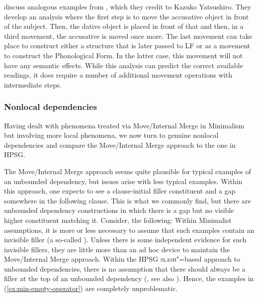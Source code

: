\documentclass[output=paper
 	        ,biblatex
                ,babelshorthands
                ,newtxmath
                ,draftmode
                ,colorlinks, citecolor=brown
]{langscibook}
\begin{document}
\citet[]{SE2002a} discuss analogous examples from , which they credit to
Kazuko Yatsushiro. They develop an analysis where the first step is to move
the accusative object in front of the subject. Then, the dative object is placed in front of that
and then, in a third movement, the accusative is moved once more. The last movement can take place
to construct either a structure that is later passed to LF or as a movement to construct the
Phonological Form. In the latter case, this movement will not have any semantic effects. While this
analysis can predict the correct available readings, it does require a number of additional movement
operations with intermediate steps.%


\subsubsection{Nonlocal dependencies}

Having dealt with phenomena treated via Move/Internal Merge in Minimalism but involving more local
phenomena, we now turn to genuine nonlocal dependencies and compare the Move/Internal Merge approach
to the one in HPSG.


The Move/Internal Merge approach seems quite plausible for typical examples of an unbounded
dependency, but issues arise with less typical examples. Within this approach, one expects to see a clause-initial filler constituent and a gap somewhere in the following clause. This is what we commonly
find, but there are unbounded dependency constructions in which there is a gap but no visible higher
constituent matching it. Consider, \eg the following: 
\eal\label{ex:min-empty-operator}
\zl 
Within Minimalist assumptions, it is more or less necessary to assume that such examples contain an
invisible filler (a so-called ). Unless there is some independent evidence for such
invisible fillers, they are little more than an ad hoc device to maintain the Move/Internal Merge
approach. Within the HPSG \textsc{slash}"=based approach to unbounded dependencies, there is no assumption
that there should always be a filler at the top of an unbounded dependency
(\citealp[Chapter~4]{ps2}, see also \crossrefchapteralt[\pageref{udc:page-no-filler-start}--\pageref{udc:page-no-filler-end}]{udc}). Hence, the examples in
(\ref{ex:min-empty-operator}) are completely unproblematic.  
\end{document}
